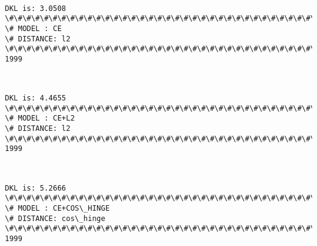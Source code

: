 \documentclass[11pt]{article}
\begin{document}
    \begin{center}
    \end{center}
    { \hspace*{\fill} \\}
    
    \begin{Verbatim}[commandchars=\\\{\}]
DKL is: 3.0508
\#\#\#\#\#\#\#\#\#\#\#\#\#\#\#\#\#\#\#\#\#\#\#\#\#\#\#\#\#\#\#\#\#\#\#\#\#\#\#\#\#\#\#\#\#\#\#\#\#\#\#\#\#\#\#\#\#\#\#\#\#\#\#\#\#\#\#\#\#\#\#\#\#\#\#\#
\# MODEL : CE
\# DISTANCE: l2
\#\#\#\#\#\#\#\#\#\#\#\#\#\#\#\#\#\#\#\#\#\#\#\#\#\#\#\#\#\#\#\#\#\#\#\#\#\#\#\#\#\#\#\#\#\#\#\#\#\#\#\#\#\#\#\#\#\#\#\#\#\#\#\#\#\#\#\#\#\#\#\#\#\#\#\#
1999

    \end{Verbatim}

    \begin{center}
    \end{center}
    { \hspace*{\fill} \\}
    
    \begin{Verbatim}[commandchars=\\\{\}]
DKL is: 4.4655
\#\#\#\#\#\#\#\#\#\#\#\#\#\#\#\#\#\#\#\#\#\#\#\#\#\#\#\#\#\#\#\#\#\#\#\#\#\#\#\#\#\#\#\#\#\#\#\#\#\#\#\#\#\#\#\#\#\#\#\#\#\#\#\#\#\#\#\#\#\#\#\#\#\#\#\#
\# MODEL : CE+L2
\# DISTANCE: l2
\#\#\#\#\#\#\#\#\#\#\#\#\#\#\#\#\#\#\#\#\#\#\#\#\#\#\#\#\#\#\#\#\#\#\#\#\#\#\#\#\#\#\#\#\#\#\#\#\#\#\#\#\#\#\#\#\#\#\#\#\#\#\#\#\#\#\#\#\#\#\#\#\#\#\#\#
1999

    \end{Verbatim}

    \begin{center}
    \end{center}
    { \hspace*{\fill} \\}
    
    \begin{Verbatim}[commandchars=\\\{\}]
DKL is: 5.2666
\#\#\#\#\#\#\#\#\#\#\#\#\#\#\#\#\#\#\#\#\#\#\#\#\#\#\#\#\#\#\#\#\#\#\#\#\#\#\#\#\#\#\#\#\#\#\#\#\#\#\#\#\#\#\#\#\#\#\#\#\#\#\#\#\#\#\#\#\#\#\#\#\#\#\#\#
\# MODEL : CE+COS\_HINGE
\# DISTANCE: cos\_hinge
\#\#\#\#\#\#\#\#\#\#\#\#\#\#\#\#\#\#\#\#\#\#\#\#\#\#\#\#\#\#\#\#\#\#\#\#\#\#\#\#\#\#\#\#\#\#\#\#\#\#\#\#\#\#\#\#\#\#\#\#\#\#\#\#\#\#\#\#\#\#\#\#\#\#\#\#
1999

    \end{Verbatim}
\end{document}
